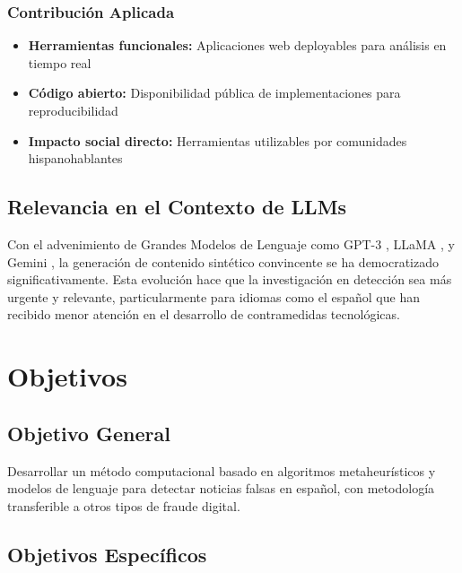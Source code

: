 \subsubsection{Contribución Aplicada}
\begin{itemize}
    \item \textbf{Herramientas funcionales:} Aplicaciones web deployables para análisis en tiempo real
    \item \textbf{Código abierto:} Disponibilidad pública de implementaciones para reproducibilidad
    \item \textbf{Impacto social directo:} Herramientas utilizables por comunidades hispanohablantes
\end{itemize}

\subsection{Relevancia en el Contexto de LLMs}

Con el advenimiento de Grandes Modelos de Lenguaje como GPT-3 \cite{brown2020language}, LLaMA \cite{touvron2023llama}, y Gemini \cite{gemini2023family}, la generación de contenido sintético convincente se ha democratizado significativamente. Esta evolución hace que la investigación en detección sea más urgente y relevante, particularmente para idiomas como el español que han recibido menor atención en el desarrollo de contramedidas tecnológicas.

\section{Objetivos}

\subsection*{Objetivo General}
Desarrollar un método computacional basado en algoritmos metaheurísticos y modelos de lenguaje para detectar noticias falsas en español, con metodología transferible a otros tipos de fraude digital.

\subsection*{Objetivos Específicos}


